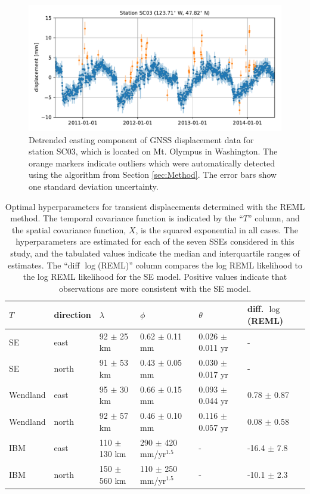 \documentclass[10pt,a4paper]{article}
\begin{document}
\begin{figure}
\includegraphics{figures/outliers/outliers.pdf}
\caption{Detrended easting component of GNSS displacement data for station SC03, which is located on Mt. Olympus in Washington.  The orange markers indicate outliers which were automatically detected using the algorithm from Section \ref{sec:Method}. The error bars show one standard deviation uncertainty.}   
\label{fig:Outliers}
\end{figure}

\begin{table}\label{tab:Parameters}
\begin{tabular} {l l l l l l}
$T$ & direction & $\lambda$  & $\phi$   & $\theta$  & diff. $\log$(REML) \\ \hline
SE & east   & 92 $\pm$ 25 km  & 0.62 $\pm$ 0.11 mm  & 0.026 $\pm$ 0.011 yr  &  - \\
SE & north  & 91 $\pm$ 53 km  & 0.43 $\pm$ 0.05 mm  & 0.030 $\pm$ 0.017 yr  &  - \\
Wendland & east   & 95 $\pm$ 30 km  & 0.66 $\pm$ 0.15 mm  & 0.093 $\pm$ 0.044 yr &  0.78 $\pm$ 0.87 \\
Wendland & north  & 92 $\pm$ 57 km  & 0.46 $\pm$ 0.10 mm  & 0.116 $\pm$ 0.057 yr &  0.08 $\pm$ 0.58 \\
IBM & east   & 110 $\pm$ 130 km & 290 $\pm$ 420 mm/yr$^{1.5}$  & -          & -16.4 $\pm$ 7.8 \\
IBM & north  & 150 $\pm$ 560 km & 110 $\pm$ 250 mm/yr$^{1.5}$ & -           & -10.1 $\pm$ 2.3 \\
\end{tabular}
\caption{Optimal hyperparameters for transient displacements determined with the REML method.  The temporal covariance function is indicated by the ``$T$'' column, and the spatial covariance function, $X$, is the squared exponential in all cases. The hyperparameters are estimated for each of the seven SSEs considered in this study, and the tabulated values indicate the median and interquartile ranges of estimates.   
The ``diff $\log$(REML)'' column compares the log REML likelihood to the log REML likelihood for the SE model. Positive values indicate that observations are more consistent with the SE model.} 
\end{table}
\end{document}

